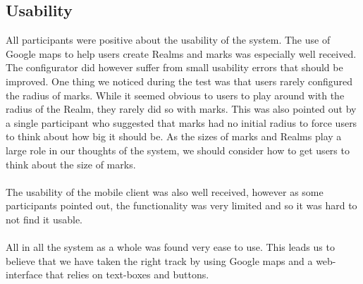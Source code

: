 \subsection{Usability} %
\label{sub:usability}
All participants were positive about the usability of the system. The use of Google maps to help users create Realms and marks was especially well received. The configurator did however suffer from small usability errors that should be improved. One thing we noticed during the test was that users rarely configured the radius of marks. While it seemed obvious to users to play around with the radius of the Realm, they rarely did so with marks. This was also pointed out by a single participant who suggested that marks had no initial radius to force users to think about how big it should be. As the sizes of marks and Realms play a large role in our thoughts of the system, we should consider how to get users to think about the size of marks.
\\\\
The usability of the mobile client was also well received, however as some participants pointed out, the functionality was very limited and so it was hard to not find it usable.
\\\\
All in all the system as a whole was found very ease to use. This leads us to believe that we have taken the right track by using Google maps and a web-interface that relies on text-boxes and buttons.


